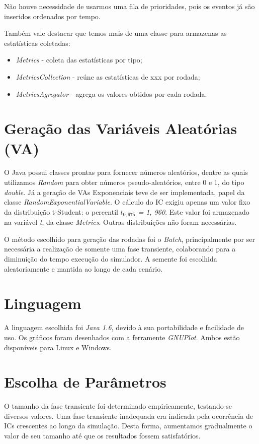 \documentclass[a4paper,12pt]{report}
\begin{document}
Não houve necessidade de usarmos uma fila de prioridades, pois os eventos já são inseridos ordenados por tempo.

Também vale destacar que temos mais de uma classe para armazenas as estatísticas coletadas:
\begin{itemize}
  \item \textit{Metrics} - coleta das estatísticas por tipo;
  \item \textit{MetricsCollection} - reúne as estatísticas de xxx por rodada;
  \item \textit{MetricsAgregator} - agrega os valores obtidos por cada rodada.
\end{itemize}

\section{Geração das Variáveis Aleatórias (VA)}
O Java possui classes prontas para fornecer números aleatórios, dentre as quais utilizamos \textit{Random} para obter números pseudo-aleatórios, entre 0 e 1, do tipo \textit{double}. Já a geração de VAs Exponenciais teve de ser implementada, papel da classe \textit{RandomExponentialVariable}. O cálculo do IC exigiu apenas um valor fixo da distribuição t-Student: o percentil \textit{$t_{0,975}$ = 1, 960}. Este valor foi armazenado na variável \textit{t}, da classe \textit{Metrics}. Outras distribuições não foram necessárias.

O método escolhido para geração das rodadas foi o \textit{Batch}, principalmente por ser necessária a realização de somente uma fase transiente, colaborando para a diminuição do tempo execução do simulador. A semente foi escolhida aleatoriamente e mantida ao longo de cada cenário.

\section{Linguagem}
A linguagem escolhida foi \textit{Java 1.6}, devido à sua portabilidade e facilidade de uso. Os gráficos foram desenhados com a ferramente \textit{GNUPlot}. Ambos estão disponíveis para Linux e Windows.

\section{Escolha de Parâmetros}
O tamanho da fase transiente foi determinado empiricamente, testando-se diversos valores. Uma fase transiente inadequada era indicada pela ocorrência de ICs crescentes ao longo da simulação. Desta forma, aumentamos gradualmente o valor de seu tamanho até que os resultados fossem satisfatórios.
\end{document}
